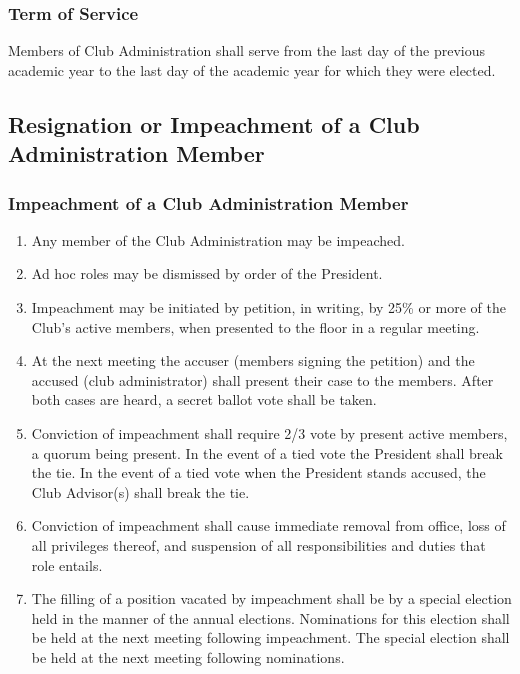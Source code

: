 \documentclass[english,11pt]{article}
\begin{document}
\subsubsection{Term of Service} \label{subsect:cadmin:selection:terms}
Members of Club Administration shall serve from the last day of the previous academic year to the last day of the academic year for which they were elected.

\subsection{Resignation or Impeachment of a Club Administration Member} \label{sect:cadmin:removal}
\subsubsection{Impeachment of a Club Administration Member} \label{subsect:cadmin:removal:impeachment}

\begin{enumerate}[label=\alph*.]
    \item Any member of the Club Administration may be impeached.
    \item Ad hoc roles may be dismissed by order of the President.
    \item Impeachment may be initiated by petition, in writing, by 25\% or more of the Club's active members, when presented to the floor in a regular meeting.
    \item At the next meeting the accuser (members signing the petition) and the accused (club administrator) shall present their case to the members.
          After both cases are heard, a secret ballot vote shall be taken.
    \item Conviction of impeachment shall require 2/3 vote by present active members, a quorum being present.
          In the event of a tied vote the President shall break the tie.
          In the event of a tied vote when the President stands accused, the Club Advisor(s) shall break the tie.
    \item Conviction of impeachment shall cause immediate removal from office, loss of all privileges thereof, and suspension of all responsibilities and duties that role entails.
    \item The filling of a position vacated by impeachment shall be by a special election held in the manner of the annual elections.
          Nominations for this election shall be held at the next meeting following impeachment.
          The special election shall be held at the next meeting following nominations.
\end{enumerate}
\end{document}
